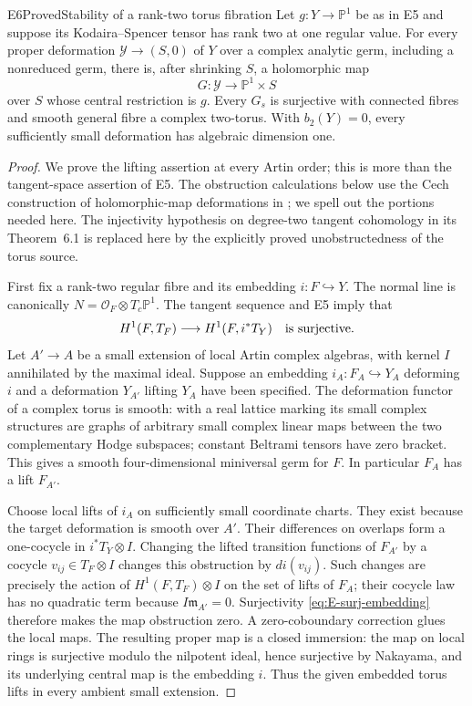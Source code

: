 
\begin{statement}{E6}{Proved}{Stability of a rank-two torus fibration}
Let $g:Y\to\mathbb P^1$ be as in E5 and suppose its
Kodaira--Spencer tensor has rank two at one regular value. For every
proper deformation $\mathcal Y\to(S,0)$ of $Y$ over a complex
analytic germ, including a nonreduced germ, there is, after shrinking
$S$, a holomorphic map
\[
 G:\mathcal Y\longrightarrow\mathbb P^1\times S
\]
over $S$ whose central restriction is $g$. Every $G_s$ is surjective
with connected fibres and smooth general fibre a complex two-torus.
With $b_2(Y)=0$, every sufficiently small deformation has algebraic
dimension one.
\end{statement}
\begin{proof}
We prove the lifting assertion at every Artin order; this is more
than the tangent-space assertion of E5. The obstruction calculations
below use the Cech construction of holomorphic-map deformations
in \cite[\S4, equations (4.3)--(4.5), and \S6]{Horikawa1974};
we spell out the portions needed here. The injectivity hypothesis
on degree-two tangent cohomology in its Theorem~6.1 is replaced
here by the explicitly proved unobstructedness of the torus source.

First fix a rank-two regular fibre and its embedding $i:F\hookrightarrow
Y$. The normal line is canonically $N=\mathcal O_F\otimes T_c\mathbb
P^1$. The tangent sequence and E5 imply that
\begin{equation}\label{eq:E-surj-embedding}
 H^1(F,T_F)\longrightarrow H^1(F,i^*T_Y)
 \quad\hbox{is surjective}.
\end{equation}
Let $A'\to A$ be a small extension of local Artin complex algebras,
with kernel $I$ annihilated by the maximal ideal. Suppose an embedding
$i_A:F_A\hookrightarrow Y_A$ deforming $i$ and a deformation
$Y_{A'}$ lifting $Y_A$ have been specified. The deformation functor
of a complex torus is smooth: with a real lattice marking its small
complex structures are graphs of arbitrary small complex linear maps
between the two complementary Hodge subspaces; constant Beltrami
tensors have zero bracket. This gives a smooth four-dimensional
miniversal germ for $F$. In particular $F_A$ has a lift $F_{A'}$.

Choose local lifts of $i_A$ on sufficiently small coordinate charts.
They exist because the target deformation is smooth over $A'$.
Their differences on overlaps form a one-cocycle in
$i^*T_Y\otimes I$. Changing the lifted transition functions of
$F_{A'}$ by a cocycle $v_{ij}\in T_F\otimes I$ changes this
obstruction by $di(v_{ij})$. Such changes are precisely the action
of $H^1(F,T_F)\otimes I$ on the set of lifts of $F_A$; their
cocycle law has no quadratic term because $I\mathfrak m_{A'}=0$.
Surjectivity \eqref{eq:E-surj-embedding} therefore makes the map
obstruction zero. A zero-coboundary correction glues the local maps.
The resulting proper map is a closed immersion: the map on local
rings is surjective modulo the nilpotent ideal, hence surjective
by Nakayama, and its underlying central map is the embedding $i$.
Thus the given embedded torus lifts in every ambient small extension.


\end{proof}
